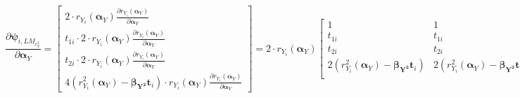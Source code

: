 \documentclass[]{article}
\begin{document}
{{\[
\frac{\partial \pmb{\psi}_{i,LM_{r^2_Y}}}{\partial \pmb{\alpha}_Y} = 
	\begin{bmatrix}
		2\cdot r_{Y_i}(\pmb{\alpha}_Y) \frac{\partial r_{Y_i}(\pmb{\alpha}_Y)}{\partial \pmb{\alpha}_Y} \\
		t_{1i} \cdot 2 \cdot r_{Y_i}(\pmb{\alpha}_Y) \frac{\partial r_{Y_i}(\pmb{\alpha}_Y)}{\partial \pmb{\alpha}_Y}\\
		t_{2i} \cdot 2 \cdot r_{Y_i}(\pmb{\alpha}_Y) \frac{\partial r_{Y_i}(\pmb{\alpha}_Y)}{\partial \pmb{\alpha}_Y}\\
		4(r^2_{Y_i}(\pmb{\alpha}_Y) - \pmb{\beta_{Y^2}}\pmb{t}_i)\cdot r_{Y_i}(\pmb{\alpha}_Y) \frac{\partial r_{Y_i}(\pmb{\alpha}_Y)}{\partial \pmb{\alpha}_Y}
 	\end{bmatrix}=
2\cdot r_{Y_i}(\pmb{\alpha}_Y) 
	\begin{bmatrix}
		1 & 1\\
		t_{1i} & t_{1i} \\
		t_{2i} & t_{2i} \\
		2(r^2_{Y_i}(\pmb{\alpha}_Y) - \pmb{\beta_{Y^2}}\pmb{t}_i) & 2(r^2_{Y_i}(\pmb{\alpha}_Y) - \pmb{\beta_{Y^2}}\pmb{t}_i)\\
 	\end{bmatrix} 
  \circ
	\begin{bmatrix}
		\frac{\partial r_{Y_i}(\pmb{\alpha}_Y)}{\partial \alpha_{Y,0}} & \frac{\partial r_{Y_i}(\pmb{\alpha}_Y)}{\partial \alpha_{Y,1}}\\
		\frac{\partial r_{Y_i}(\pmb{\alpha}_Y)}{\partial \alpha_{Y,0}} & \frac{\partial r_{Y_i}(\pmb{\alpha}_Y)}{\partial \alpha_{Y,1}}\\
		\frac{\partial r_{Y_i}(\pmb{\alpha}_Y)}{\partial \alpha_{Y,0}} & \frac{\partial r_{Y_i}(\pmb{\alpha}_Y)}{\partial \alpha_{Y,1}}\\
		\frac{\partial r_{Y_i}(\pmb{\alpha}_Y)}{\partial \alpha_{Y,0}} & \frac{\partial r_{Y_i}(\pmb{\alpha}_Y)}{\partial \alpha_{Y,1}}\\
 	\end{bmatrix} 
\]


}}
\end{document}
